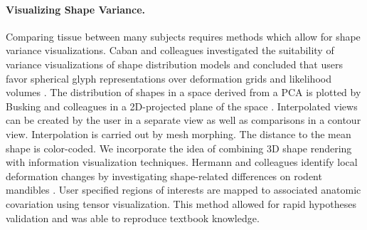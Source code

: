 \documentclass[journal]{style/vgtc} 			          %
\begin{document}
\paragraph{Visualizing Shape Variance.}
Comparing tissue between many subjects requires methods which allow for shape variance visualizations.
%
Caban and colleagues investigated the suitability of variance visualizations of shape distribution models and concluded that users favor spherical glyph representations over deformation grids and likelihood volumes \cite{Caban2011}.
%
The distribution of shapes in a space derived from a PCA is plotted by Busking and colleagues in a 2D-projected plane of the space \cite{Busking2010a}.
%
Interpolated views can be created by the user in a separate view as well as comparisons in a contour view.
%
Interpolation is carried out by mesh morphing.
%
The distance to the mean shape is color-coded.
%
We incorporate the idea of combining 3D shape rendering with information visualization techniques.
%
%
%
Hermann and colleagues identify local deformation changes by investigating shape-related differences on rodent mandibles \cite{Hermann2014}.
%
User specified regions of interests are mapped to associated anatomic covariation using tensor visualization.
%
This method allowed for rapid hypotheses validation and was able to reproduce textbook knowledge.
%
%
%

\end{document}
